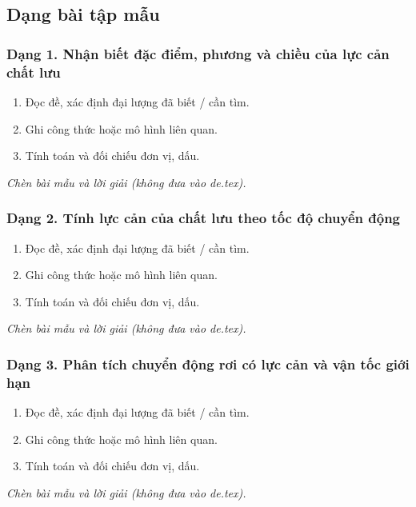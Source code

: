 

\subsection{Dạng bài tập mẫu}
\subsubsection{Dạng 1. Nhận biết đặc điểm, phương và chiều của lực cản chất lưu}
\begin{phuongphap}
\begin{enumerate}
\item Đọc đề, xác định đại lượng đã biết / cần tìm.
\item Ghi công thức hoặc mô hình liên quan.
\item Tính toán và đối chiếu đơn vị, dấu.
\end{enumerate}
\end{phuongphap}
\begin{vidumau}
\textit{Chèn bài mẫu và lời giải (không đưa vào de.tex).}
\end{vidumau}

\subsubsection{Dạng 2. Tính lực cản của chất lưu theo tốc độ chuyển động}
\begin{phuongphap}
\begin{enumerate}
\item Đọc đề, xác định đại lượng đã biết / cần tìm.
\item Ghi công thức hoặc mô hình liên quan.
\item Tính toán và đối chiếu đơn vị, dấu.
\end{enumerate}
\end{phuongphap}
\begin{vidumau}
\textit{Chèn bài mẫu và lời giải (không đưa vào de.tex).}
\end{vidumau}

\subsubsection{Dạng 3. Phân tích chuyển động rơi có lực cản và vận tốc giới hạn}
\begin{phuongphap}
\begin{enumerate}
\item Đọc đề, xác định đại lượng đã biết / cần tìm.
\item Ghi công thức hoặc mô hình liên quan.
\item Tính toán và đối chiếu đơn vị, dấu.
\end{enumerate}
\end{phuongphap}
\begin{vidumau}
\textit{Chèn bài mẫu và lời giải (không đưa vào de.tex).}
\end{vidumau}

